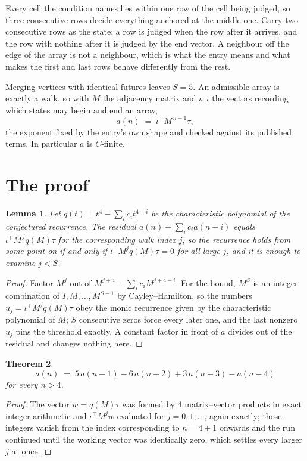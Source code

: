 \documentclass[11pt,a4paper]{article}
\theoremstyle{plain}
\newtheorem{theorem}{Theorem}
\newtheorem{lemma}[theorem]{Lemma}
\theoremstyle{definition}
\begin{document}
Every cell the condition names lies within one row of the cell being judged, so three consecutive rows decide everything anchored at the middle one. Carry two consecutive rows as the state; a row is judged when the row after it arrives, and the row with nothing after it is judged by the end vector. A neighbour off the edge of the array is not a neighbour, which is what the entry means and what makes the first and last rows behave differently from the rest.

Merging vertices with identical futures leaves $S=5$. An admissible array is exactly a walk, so with $M$ the adjacency matrix and $\iota,\tau$ the vectors recording which states may begin and end an array,
\[
a(n)\;=\;\iota^{\!\top}M^{\,n-1}\tau ,
\]
the exponent fixed by the entry's own shape and checked against its published terms. In
particular $a$ is $C$-finite.

\section{The proof}

\begin{lemma}\label{lem:crit}
Let $q(t)=t^{4}-\sum_i c_it^{4-i}$ be the characteristic polynomial of the
conjectured recurrence. The residual $a(n)-\sum_ic_ia(n-i)$ equals
$\iota^{\!\top}M^{\,j}q(M)\tau$ for the corresponding walk index $j$, so the recurrence
holds from some point on if and only if $\iota^{\!\top}M^{j}q(M)\tau=0$ for all large $j$,
and it is enough to examine $j<S$.
\end{lemma}

\begin{proof}
Factor $M^{j}$ out of $M^{j+4}-\sum_ic_iM^{j+4-i}$. For the bound, $M^{S}$
is an integer combination of $I,M,\dots,M^{S-1}$ by Cayley--Hamilton, so the numbers
$u_j=\iota^{\!\top}M^{j}q(M)\tau$ obey the monic recurrence given by the characteristic
polynomial of $M$; $S$ consecutive zeros force every later one, and the last nonzero $u_j$
pins the threshold exactly. A constant factor in front of $a$ divides out of the residual and
changes nothing here.
\end{proof}

\begin{theorem}
\[
a(n)\;=\;5\,a(n-1) - 6\,a(n-2) + 3\,a(n-3) - a(n-4)
\]
for every $n>4$.
\end{theorem}

\begin{proof}
The vector $w=q(M)\tau$ was formed by $4$ matrix--vector products in exact integer
arithmetic and $\iota^{\!\top}M^{j}w$ evaluated for $j=0,1,\dots$, again exactly; those
integers vanish from the index corresponding to $n=4+1$ onwards and the run continued
until the working vector was identically zero, which settles every larger $j$ at once.
\end{proof}
\end{document}
